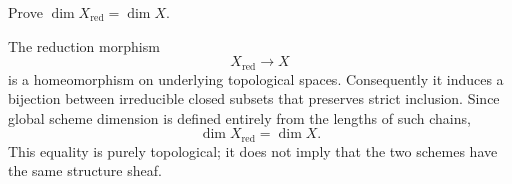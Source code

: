 \begin{problem}\label{prob:vi30-08}
Prove \(\dim X_{\mathrm{red}}=\dim X\).

\end{problem}

\ifdefined\FullProblemDossiers
\begin{solution}
The reduction morphism
\[
X_{\mathrm{red}}\to X
\]
is a homeomorphism on underlying topological spaces. Consequently it induces a bijection between irreducible closed
subsets that preserves strict inclusion. Since global scheme dimension is defined entirely from the lengths of
such chains,
\[
\boxed{\dim X_{\mathrm{red}}=\dim X}.
\]
This equality is purely topological; it does not imply that the two schemes have the same structure sheaf.
\end{solution}
\fi
